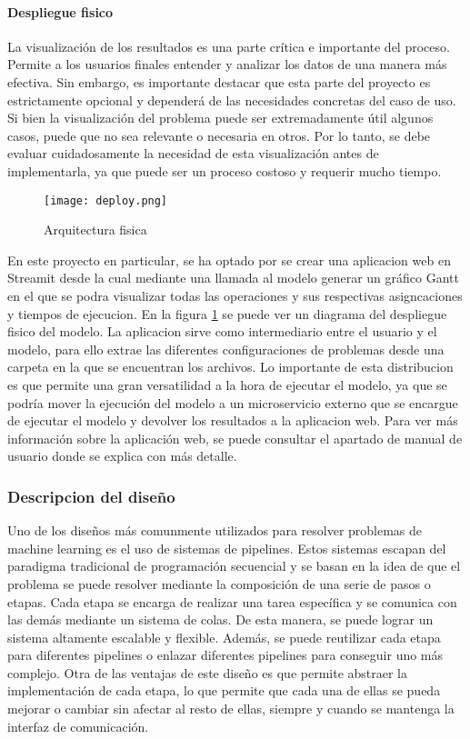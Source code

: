 \paragraph{Despliegue fisico}
La visualización de los resultados es una parte crítica e importante del proceso. Permite 
a los usuarios finales entender y analizar los datos de una manera más efectiva.  
Sin embargo, es importante destacar que esta parte del proyecto es 
estrictamente opcional y dependerá de las necesidades concretas del caso de uso. 
Si bien la visualización del problema puede ser extremadamente útil algunos casos, puede que no sea 
relevante o necesaria en otros. Por lo tanto, se debe evaluar cuidadosamente la necesidad de 
esta visualización antes de implementarla, ya que puede ser un proceso costoso y 
requerir mucho tiempo.\medskip

\begin{figure}[ht]
    \centering
    \texttt{[image: deploy.png]}
    \caption{Arquitectura fisica}
    \label{fig:despliegue}
\end{figure}

En este proyecto en particular, se ha optado por se crear una aplicacion web en Streamit 
desde la cual mediante una llamada al modelo generar un gráfico Gantt en el que se podra
visualizar todas las operaciones y sus respectivas asigncaciones y tiempos de ejecucion.
En la figura \ref{fig:despliegue} se puede ver un diagrama del despliegue fisico del modelo.
La aplicacion sirve como intermediario entre el usuario y el modelo, para ello extrae las
diferentes configuraciones de problemas desde una carpeta en la que se encuentran los 
archivos. Lo importante de esta distribucion es que permite una gran versatilidad a la hora
de ejecutar el modelo, ya que se podría mover la ejecución del modelo a un microservicio
externo que se encargue de ejecutar el modelo y devolver los resultados a la aplicacion web.
Para ver más información sobre la aplicación web, se puede consultar el apartado de manual
de usuario donde se explica con más detalle. 

\subsubsection{Descripcion del diseño}
Uno de los diseños más comunmente utilizados para resolver problemas de machine learning
es el uso de sistemas de pipelines. Estos sistemas escapan del paradigma tradicional de
programación secuencial y se basan en la idea de que el problema se puede resolver
mediante la composición de una serie de pasos o etapas. Cada etapa se encarga de realizar
una tarea específica y se comunica con las demás mediante un sistema de colas. De esta
manera, se puede lograr un sistema altamente escalable y flexible. Además, se puede
reutilizar cada etapa para diferentes pipelines o enlazar diferentes pipelines para
conseguir uno más complejo. Otra de las ventajas de este diseño es que permite
abstraer la implementación de cada etapa, lo que permite que cada una de ellas se pueda
mejorar o cambiar sin afectar al resto de ellas, siempre y cuando se mantenga la
interfaz de comunicación.

